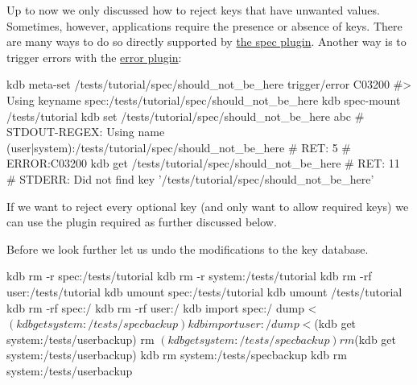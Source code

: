 Up to now we only discussed how to reject keys that have unwanted values. Sometimes, however, applications require the presence or absence of keys. There are many ways to do so directly supported by \hyperlink{autotoc_md612_src_plugins_spec_README_md}{the spec plugin}. Another way is to trigger errors with the \hyperlink{autotoc_md199_src_plugins_error_README_md}{error plugin}\+:


\begin{DoxyCode}
kdb meta-set /tests/tutorial/spec/should\_not\_be\_here trigger/error C03200
#> Using keyname spec:/tests/tutorial/spec/should\_not\_be\_here
kdb spec-mount /tests/tutorial
kdb set /tests/tutorial/spec/should\_not\_be\_here abc
# STDOUT-REGEX: Using name (user|system):/tests/tutorial/spec/should\_not\_be\_here
# RET:    5
# ERROR:C03200
kdb get /tests/tutorial/spec/should\_not\_be\_here
# RET: 11
# STDERR: Did not find key '/tests/tutorial/spec/should\_not\_be\_here'
\end{DoxyCode}


If we want to reject every optional key (and only want to allow required keys) we can use the plugin {\ttfamily required} as further discussed below.

Before we look further let us undo the modifications to the key database.


\begin{DoxyCode}
kdb rm -r spec:/tests/tutorial
kdb rm -r system:/tests/tutorial
kdb rm -rf user:/tests/tutorial
kdb umount spec:/tests/tutorial
kdb umount /tests/tutorial
kdb rm -rf spec:/
kdb rm -rf user:/
kdb import spec:/ dump < $(kdb get system:/tests/specbackup)
kdb import user:/ dump < $(kdb get system:/tests/userbackup)
rm $(kdb get system:/tests/specbackup)
rm $(kdb get system:/tests/userbackup)
kdb rm system:/tests/specbackup
kdb rm system:/tests/userbackup
\end{DoxyCode}
 